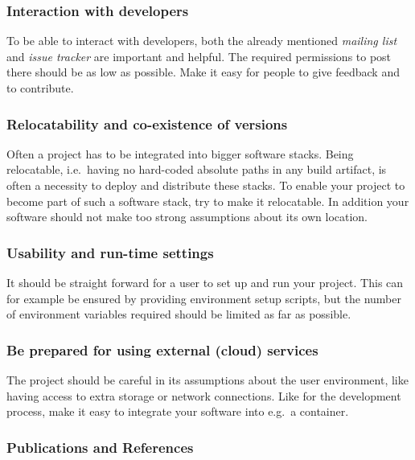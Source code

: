 \documentclass[12pt,a4paper]{article}
\begin{document}
\subsubsection{Interaction with
developers}\label{interaction-with-developers}

To be able to interact with developers, both the already mentioned
\emph{mailing list} and \emph{issue tracker} are important and helpful.
The required permissions to post there should be as low as possible.
Make it easy for people to give feedback and to contribute.

\subsubsection{Relocatability and co-existence of
versions}\label{relocatability-and-co-existence-of-versions}

Often a project has to be integrated into bigger software stacks. Being
relocatable, i.e.~having no hard-coded absolute paths in any build
artifact, is often a necessity to deploy and distribute these stacks. To
enable your project to become part of such a software stack, try to make
it relocatable. In addition your software should not make too strong
assumptions about its own location.

\subsubsection{Usability and run-time
settings}\label{usability-and-run-time-settings}

It should be straight forward for a user to set up and run your project.
This can for example be ensured by providing environment setup scripts,
but the number of environment variables required should be limited as
far as possible.

\subsubsection{Be prepared for using external (cloud)
services}\label{be-prepared-for-using-external-cloud-services-1}

The project should be careful in its assumptions about the user
environment, like having access to extra storage or network connections.
Like for the development process, make it easy to integrate your
software into e.g.~a container.

\subsubsection{Publications and
References}\label{publications-and-references}
\end{document}
